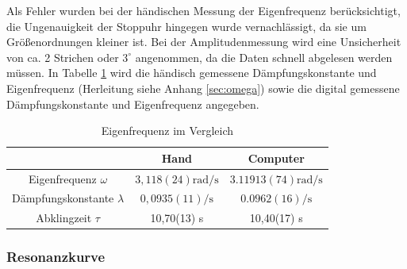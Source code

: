 \documentclass[11pt, a4paper]{article}
\begin{document}
    Als Fehler wurden bei der händischen Messung der Eigenfrequenz berücksichtigt, die Ungenauigkeit der Stoppuhr hingegen
    wurde vernachlässigt, da sie um Größenordnungen kleiner ist. Bei der Amplitudenmessung wird eine Unsicherheit von ca. 2 Strichen
    oder $3^{\circ}$ angenommen, da die Daten schnell abgelesen werden müssen.
    In Tabelle \ref{Tab:tableeig} wird die händisch gemessene Dämpfungskonstante und Eigenfrequenz (Herleitung siehe Anhang \ref{sec:omega}) sowie die
    digital gemessene Dämpfungskonstante und Eigenfrequenz angegeben. 
    \begin{table}[H]
        \centering
        \begin{tabular}{c c c} 
            & Hand & Computer \\ \hline
            Eigenfrequenz $\omega$ & $3,118(24) \si{\radian\per\second}$ & $3.11913(74) \si{\radian\per\second}$ \\
            Dämpfungskonstante $\lambda$ & $0,0935(11) \si{\per\second}$ & $0.0962(16) \si{\per\second}$ \\
            Abklingzeit $\tau$ & 10,70(13) \si{\second} & 10,40(17) \si{\second} \\

            
        \end{tabular}
        \caption{Eigenfrequenz im Vergleich}
        \label{Tab:tableeig}
    \end{table}

	\subsubsection{Resonanzkurve}
\end{document}
